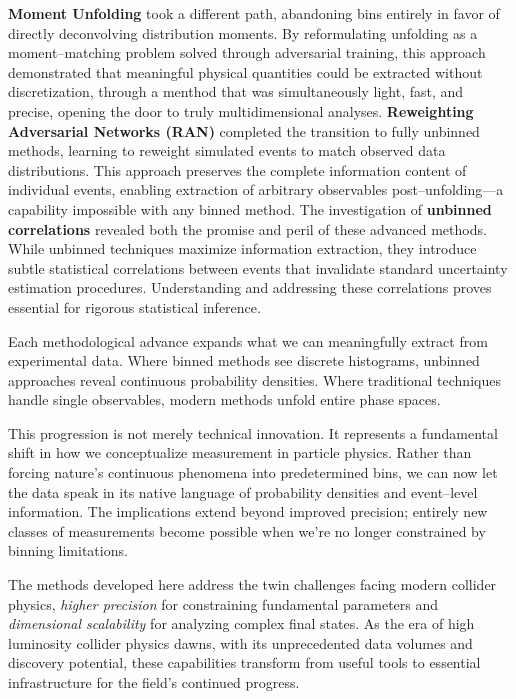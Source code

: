     \textbf{Moment Unfolding} took a different path, abandoning bins entirely in favor of directly deconvolving distribution moments.
    By reformulating unfolding as a moment--matching problem solved through adversarial training, this approach demonstrated that meaningful physical quantities could be extracted without discretization, through a menthod that was simultaneously light, fast, and precise, opening the door to truly multidimensional analyses.
    \textbf{Reweighting Adversarial Networks (RAN)} completed the transition to fully unbinned methods, learning to reweight simulated events to match observed data distributions.
    This approach preserves the complete information content of individual events, enabling extraction of arbitrary observables post--unfolding—a capability impossible with any binned method.
    The investigation of \textbf{unbinned correlations} revealed both the promise and peril of these advanced methods.
    While unbinned techniques maximize information extraction, they introduce subtle statistical correlations between events that invalidate standard uncertainty estimation procedures.
    Understanding and addressing these correlations proves essential for rigorous statistical inference.
    
    Each methodological advance expands what we can meaningfully extract from experimental data.
    Where binned methods see discrete histograms, unbinned approaches reveal continuous probability densities.
    Where traditional techniques handle single observables, modern methods unfold entire phase spaces.

    This progression is not merely technical innovation.
    It represents a fundamental shift in how we conceptualize measurement in particle physics.
    Rather than forcing nature's continuous phenomena into predetermined bins, we can now let the data speak in its native language of probability densities and event--level information.
    The implications extend beyond improved precision; entirely new classes of measurements become possible when we're no longer constrained by binning limitations.

    The methods developed here address the twin challenges facing modern collider physics, \emph{higher precision} for constraining fundamental parameters and \emph{dimensional scalability} for analyzing complex final states.
    As the era of high luminosity collider physics dawns, with its unprecedented data volumes and discovery potential, these capabilities transform from useful tools to essential infrastructure for the field's continued progress.

